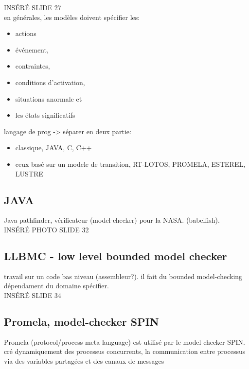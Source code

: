 \documentclass[oneside]{book}
\begin{document}
    INSÉRÉ SLIDE 27\\
    
    en générales, les modèles doivent spécifier les:
    \begin{itemize}
        \item actions
        \item événement,
        \item contraintes,
        \item conditions d'activation,
        \item situations anormale et 
        \item les états significatifs
    \end{itemize} 

    langage de prog -> séparer en deux partie:
    \begin{itemize}
        \item classique, JAVA, C, C++
        \item ceux basé sur un modele de transition, RT-LOTOS, PROMELA, ESTEREL, LUSTRE
    \end{itemize}
    
    \subsection{JAVA}
    
    Java pathfinder, vérificateur (model-checker) pour la NASA. (babelfish). \\
    
    INSÉRÉ PHOTO  SLIDE 32\\
    
    \subsection{LLBMC - low level bounded model checker}
    travail sur un code bas niveau (assembleur?). il fait du bounded model-checking dépendament du domaine spécifier.\\
    
    INSÉRÉ SLIDE 34\\
    
    \subsection{Promela, model-checker SPIN}
    Promela (protocol/process meta language) est utilisé par le model checker SPIN. cré dynamiquement des processus concurrents, la communication entre processus via des variables partagées et des canaux de messages\\
    
\end{document}
